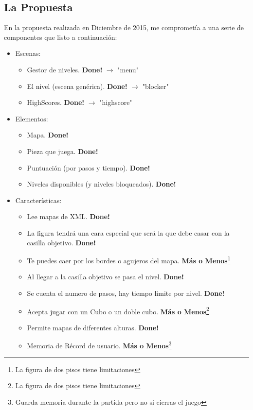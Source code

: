 \documentclass{article}
\begin{document}
\subsection{La Propuesta}
En la propuesta realizada en Diciembre de 2015, me comprometía a una
serie de componentes que listo a continuación:
\begin{itemize}
    \item Escenas: \begin{itemize}
        \item Gestor de niveles. \textbf{Done!} $\rightarrow$ "menu"
        \item El nivel (escena genérica). \textbf{Done!} $\rightarrow$ "blocker"
        \item HighScores. \textbf{Done!} $\rightarrow$ "highscore"
    \end{itemize}
    \item Elementos: \begin{itemize}
        \item Mapa. \textbf{Done!}
        \item Pieza que juega. \textbf{Done!}
        \item Puntuación (por pasos y tiempo). \textbf{Done!}
        \item Niveles disponibles (y niveles bloqueados). \textbf{Done!}
    \end{itemize}
    \item Características: \begin{itemize}
        \item Lee mapas de XML. \textbf{Done!}
        \item La figura tendrá una cara especial que será la que debe casar con la casilla objetivo. \textbf{Done!}
        \item Te puedes caer por los bordes o agujeros del mapa. \textbf{Más o Menos}\footnote{La figura de dos pisos tiene limitaciones}
        \item Al llegar a la casilla objetivo se pasa el nivel. \textbf{Done!}
        \item Se cuenta el numero de pasos, hay tiempo limite por nivel. \textbf{Done!}
        \item Acepta jugar con un Cubo o un doble cubo. \textbf{Más o Menos}\footnote{La figura de dos pisos tiene limitaciones}
        \item Permite mapas de diferentes alturas. \textbf{Done!}
        \item Memoria de Récord de usuario. \textbf{Más o Menos}\footnote{Guarda memoria durante la partida pero no si cierras el juego}
    \end{itemize}
\end{itemize}
\end{document}
